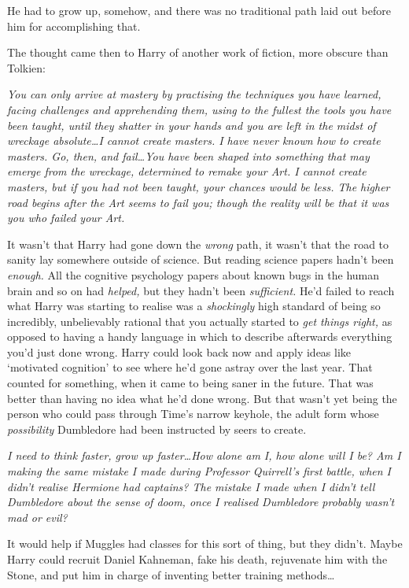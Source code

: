 He had to grow up, somehow, and there was no traditional path laid out before him for accomplishing that.

The thought came then to Harry of another work of fiction, more obscure than Tolkien:

\emph{You can only arrive at mastery by practising the techniques you have learned, facing challenges and apprehending them, using to the fullest the tools you have been taught, until they shatter in your hands and you are left in the midst of wreckage absolute…I cannot create masters. I have never known how to create masters. Go, then, and fail…You have been shaped into something that may emerge from the wreckage, determined to remake your Art. I cannot create masters, but if you had not been taught, your chances would be less. The higher road begins after the Art seems to fail you; though the reality will be that it was you who failed your Art.}

It wasn’t that Harry had gone down the \emph{wrong} path, it wasn’t that the road to sanity lay somewhere outside of science. But reading science papers hadn’t been \emph{enough.} All the cognitive psychology papers about known bugs in the human brain and so on had \emph{helped,} but they hadn’t been \emph{sufficient.} He’d failed to reach what Harry was starting to realise was a \emph{shockingly} high standard of being so incredibly, unbelievably rational that you actually started to \emph{get things right,} as opposed to having a handy language in which to describe afterwards everything you’d just done wrong. Harry could look back now and apply ideas like ‘motivated cognition’ to see where he’d gone astray over the last year. That counted for something, when it came to being saner in the future. That was better than having no idea what he’d done wrong. But that wasn’t yet being the person who could pass through Time’s narrow keyhole, the adult form whose \emph{possibility} Dumbledore had been instructed by seers to create.

\emph{I need to think faster, grow up faster…How alone am I, how alone will I be? Am I making the same mistake I made during Professor Quirrell’s first battle, when I didn’t realise Hermione had captains? The mistake I made when I didn’t tell Dumbledore about the sense of doom, once I realised Dumbledore probably wasn’t mad or evil?}

It would help if Muggles had classes for this sort of thing, but they didn’t. Maybe Harry could recruit Daniel Kahneman, fake his death, rejuvenate him with the Stone, and put him in charge of inventing better training methods…

